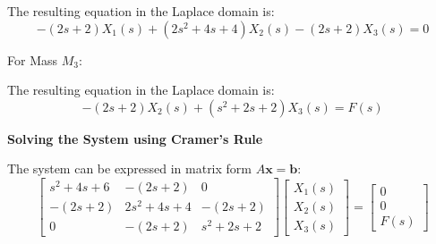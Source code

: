 \documentclass[11pt]{article}
\begin{document}
The resulting equation in the Laplace domain is:
\begin{equation}
-(2s + 2)X_1(s) + (2s^2 + 4s + 4)X_2(s) - (2s + 2)X_3(s) = 0 \tag{2}
\end{equation}

\newpage

\vspace{12pt}
{For Mass $M_3$:}
\begin{figure}[h!]
\centering
{}
\end{figure}

The resulting equation in the Laplace domain is:
\begin{equation}
-(2s + 2)X_2(s) + (s^2 + 2s + 2)X_3(s) = F(s) \tag{3}
\end{equation}

\noindent\textbf{Solving the System using Cramer's Rule}
\vspace{12pt}

The system can be expressed in matrix form $A\mathbf{x} = \mathbf{b}$:
$$
\begin{bmatrix}
s^2 + 4s + 6 & -(2s + 2) & 0 \\
-(2s + 2) & 2s^2 + 4s + 4 & -(2s + 2) \\
0 & -(2s + 2) & s^2 + 2s + 2
\end{bmatrix}
\begin{bmatrix}
X_1(s) \\
X_2(s) \\
X_3(s)
\end{bmatrix}
=
\begin{bmatrix}
0 \\
0 \\
F(s)
\end{bmatrix}
$$
\end{document}
